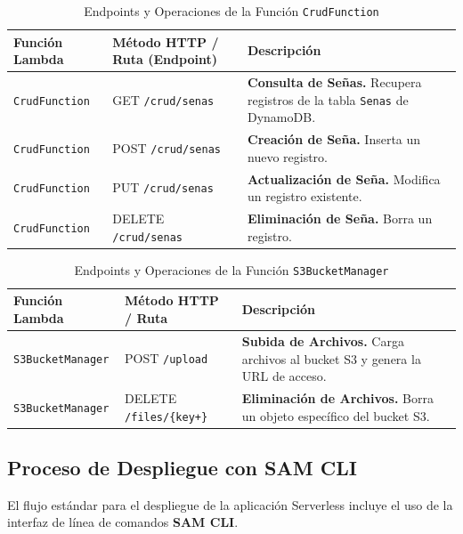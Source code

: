 \begin{table}[H]
    \centering
    \caption{Endpoints y Operaciones de la Función \texttt{CrudFunction}}
    \renewcommand{\arraystretch}{1.3}
    \begin{tabularx}{\textwidth}{|p{4cm}|p{5cm}|X|}
        \hline
        \textbf{Función Lambda} & \textbf{Método HTTP / Ruta (Endpoint)} & \textbf{Descripción} \\ \hline
        \texttt{CrudFunction} & GET \texttt{/crud/senas} & \textbf{Consulta de Señas.} Recupera registros de la tabla \texttt{Senas} de DynamoDB. \\ \hline
        \texttt{CrudFunction} & POST \texttt{/crud/senas} & \textbf{Creación de Seña.} Inserta un nuevo registro. \\ \hline
        \texttt{CrudFunction} & PUT \texttt{/crud/senas} & \textbf{Actualización de Seña.} Modifica un registro existente. \\ \hline
        \texttt{CrudFunction} & DELETE \texttt{/crud/senas} & \textbf{Eliminación de Seña.} Borra un registro. \\ \hline
    \end{tabularx}
    \label{tab:crud_endpoints}
\end{table}

\begin{table}[H]
    \centering
    \caption{Endpoints y Operaciones de la Función \texttt{S3BucketManager}}
    \renewcommand{\arraystretch}{1.3}
    \begin{tabularx}{\textwidth}{|p{4cm}|p{5cm}|X|}
        \hline
        \textbf{Función Lambda} & \textbf{Método HTTP / Ruta} & \textbf{Descripción} \\ \hline
        \texttt{S3BucketManager} & POST \texttt{/upload} & \textbf{Subida de Archivos.} Carga archivos al bucket S3 y genera la URL de acceso. \\ \hline
        \texttt{S3BucketManager} & DELETE \texttt{/files/\{key+\}} & \textbf{Eliminación de Archivos.} Borra un objeto específico del bucket S3. \\ \hline
    \end{tabularx}
    \label{tab:s3_endpoints}
\end{table}

\subsection{Proceso de Despliegue con SAM CLI}
El flujo estándar para el despliegue de la aplicación Serverless incluye el uso de la interfaz de línea de comandos \textbf{SAM CLI}.

